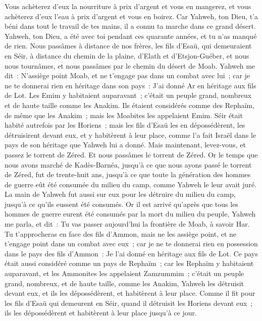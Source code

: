 \begin{multicols}{2}
Vous achèterez d'eux la nourriture à prix d'argent et vous en mangerez, et vous achèterez d'eux l'eau à prix d'argent et vous en boirez.
Car Yahweh, ton Dieu, t'a béni dans tout le travail de tes mains, il a connu ta marche dans ce grand désert. Yahweh, ton Dieu, a été avec toi pendant ces quarante années, et tu n'as manqué de rien.
Nous passâmes à distance de nos frères, les fils d'Esaü, qui demeuraient en Séir, à distance du chemin de la plaine, d'Elath et d'Etsjon-Guéber, et nous nous tournâmes, et nous passâmes par le chemin du désert de Moab.
Yahweh me dit~: N'assiège point Moab, et ne t'engage pas dans un combat avec lui~; car je ne te donnerai rien en héritage dans son pays~: J'ai donné Ar en héritage aux fils de Lot.
Les Emim y habitaient auparavant~; c'était un peuple grand, nombreux et de haute taille comme les Anakim.
Ils étaient considérés comme des Rephaïm, de même que les Anakim~; mais les Moabites les appelaient Emim.
Séir était habité autrefois par les Horiens~; mais les fils d'Esaü les en dépossédèrent, les détruisirent devant eux, et y habitèrent à leur place, comme l'a fait Israël dans le pays de son héritage que Yahweh lui a donné.
Mais maintenant, levez-vous, et passez le torrent de Zéred. Et nous passâmes le torrent de Zéred.
Or le temps que nous avons marché de Kadès-Barnéa, jusqu'à ce que nous ayons passé le torrent de Zéred, fut de trente-huit ans, jusqu'à ce que toute la génération des hommes de guerre eût été consumée du milieu du camp, comme Yahweh le leur avait juré.
La main de Yahweh fut aussi sur eux pour les détruire du milieu du camp, jusqu'à ce qu'ils eussent été consumés.
Or il est arrivé qu'après que tous les hommes de guerre eurent été consumés par la mort du milieu du peuple,
Yahweh me parla, et dit~:
Tu vas passer aujourd'hui la frontière de Moab, à savoir Har.
Tu t'approcheras en face des fils d'Ammon, mais ne les assiège point, et ne t'engage point dans un combat avec eux~; car je ne te donnerai rien en possession dans le pays des fils d'Ammon~: Je l'ai donné en héritage aux fils de Lot.
 Ce pays était aussi considéré comme un pays de Rephaïm~; car les Rephaïm y habitaient auparavant, et les Ammonites les appelaient Zamzummim~;
c'était un peuple grand, nombreux, et de haute taille, comme les Anakim, Yahweh les détruisit devant eux, et ils les dépossédèrent, et habitèrent à leur place.
Comme il fit pour les fils d'Esaü qui demeurent en Séir, quand il détruisit les Horiens devant eux~; ils les dépossédèrent et habitèrent à leur place jusqu'à ce jour.

\end{multicols}
